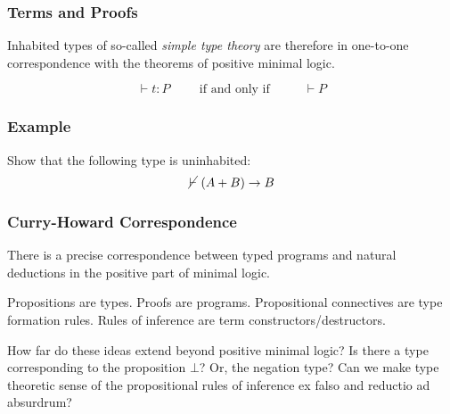 \documentclass{beamer}
\theoremstyle{indentDefn} \newtheorem{defn}[]{Definition}
\begin{document}
\begin{frame}
  \frametitle{Terms and Proofs}

  Inhabited types of so-called \emph{simple type theory} are therefore in one-to-one correspondence with the theorems of positive minimal logic. 

  $$ \vdash t : P \hspace{1cm} \text{if and only if } \hspace{1cm} \vdash P$$

\end{frame}




\begin{frame}
  \frametitle{Example}
  Show that the following type is uninhabited:
  $$ \cancel{\vdash} \ (A + B) \to B$$ 

  \vspace{6cm}

\end{frame}




\begin{frame}
  \frametitle{Curry-Howard Correspondence}

  There is a precise correspondence between typed programs and natural deductions in the positive part of minimal logic. 

  \vspace{0.5cm}

  Propositions are types. Proofs are programs. Propositional connectives are type formation rules. Rules of inference are term constructors/destructors. 

  \vspace{0.5cm}

  How far do these ideas extend beyond positive minimal logic? Is there a type corresponding to the proposition $\bot$? Or, the negation type? Can we make type theoretic sense of the propositional rules of inference ex falso and reductio ad absurdrum? 

\end{frame}
\end{document}
